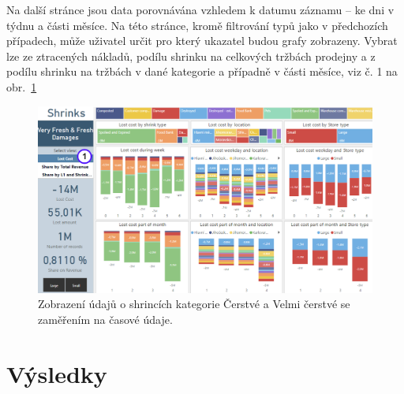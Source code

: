 Na další stránce jsou data porovnávána vzhledem k datumu záznamu -- ke dni v týdnu a části měsíce. Na této stránce, kromě filtrování typů jako v předchozích případech, může uživatel určit pro který ukazatel budou grafy zobrazeny. Vybrat lze ze ztracených nákladů, podílu shrinku na celkových tržbách prodejny a z podílu shrinku na tržbách v dané kategorie a případně v části měsíce, viz č. 1 na obr.~\ref*{obr:PBI:timeSFF}

\begin{figure}[h!]
    \centering
    \captionsetup{justification=centering}
    \includegraphics[width=\textwidth]{obrazky/PBI/timeSFF.png}
    \caption{Zobrazení údajů o shrincích kategorie Čerstvé a Velmi čerstvé se zaměřením na časové údaje.}
    \label{obr:PBI:timeSFF}
\end{figure}

\section{Výsledky}
\label{sec:vizualizace:vysl}
